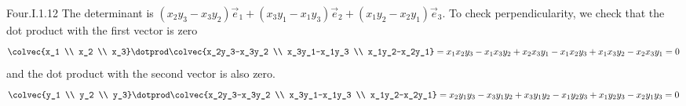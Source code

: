 \begin{ans}{Four.I.1.12}
      The determinant is
      $
        (x_2y_3-x_3y_2)\vec{e}_1
          +(x_3y_1-x_1y_3)\vec{e}_2
          +(x_1y_2-x_2y_1)\vec{e}_3
      $.
      To check perpendicularity, we check that the dot product
      with the first vector is zero
      \begin{equation*}
        \colvec{x_1 \\ x_2 \\ x_3}
        \dotprod
        \colvec{x_2y_3-x_3y_2 \\ x_3y_1-x_1y_3 \\ x_1y_2-x_2y_1}
        =x_1x_2y_3-x_1x_3y_2+x_2x_3y_1-x_1x_2y_3+x_1x_3y_2-x_2x_3y_1=0
      \end{equation*}
      and the dot product with the second vector is also zero.
      \begin{equation*}
        \colvec{y_1 \\ y_2 \\ y_3}
        \dotprod
        \colvec{x_2y_3-x_3y_2 \\ x_3y_1-x_1y_3 \\ x_1y_2-x_2y_1}
        =x_2y_1y_3-x_3y_1y_2+x_3y_1y_2-x_1y_2y_3+x_1y_2y_3-x_2y_1y_3=0
      \end{equation*}
    
\end{ans}
